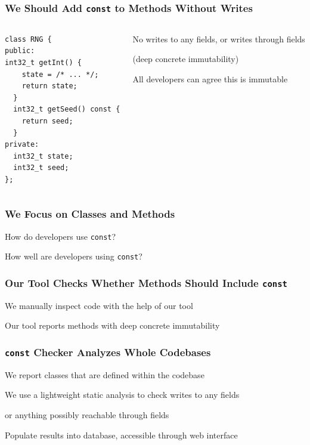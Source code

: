 \documentclass[aspectratio=169]{beamer}
\begin{document}
  \begin{frame}[fragile]
    \frametitle{We Should Add \texttt{const} to Methods Without Writes}

    \begin{columns}
      \begin{column}{0.4\textwidth}
        \begin{lstlisting}
class RNG {
public:
int32_t getInt() {
    state = /* ... */;
    return state;
  }
  int32_t getSeed() const {
    return seed;
  }
private:
  int32_t state;
  int32_t seed;
};
        \end{lstlisting}
      \end{column}
      \begin{column}{0.5\textwidth}
        No writes to any fields, or writes through fields

        (deep concrete immutability)

        \vspace{1em}

        All developers can agree this is immutable

        \vspace{4em}

      \end{column}
    \end{columns}
  \end{frame}

  \begin{frame}
    \frametitle{We Focus on Classes and Methods}

    How do developers use \texttt{const}?

    \vspace{2em}

    How well are developers using \texttt{const}?
  \end{frame}

  \begin{frame}
    \frametitle{Our Tool Checks Whether Methods Should Include \texttt{const}}

    We manually inspect code with the help of our tool

    \vspace{2em}

    Our tool reports methods with deep concrete immutability
  \end{frame}

  \begin{frame}
    \frametitle{\texttt{const} Checker Analyzes Whole Codebases}

    We report classes that are defined within the codebase

    \vspace{2em}

    We use a lightweight static analysis to check writes to any
    fields

    \hspace{1em} or anything possibly reachable through fields

    \vspace{2em}

    Populate results into database, accessible through web interface
  \end{frame}
\end{document}
